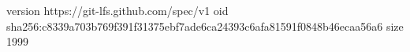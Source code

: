 version https://git-lfs.github.com/spec/v1
oid sha256:c8339a703b769f391f31375ebf7ade6ca24393c6afa81591f0848b46ecaa56a6
size 1999
